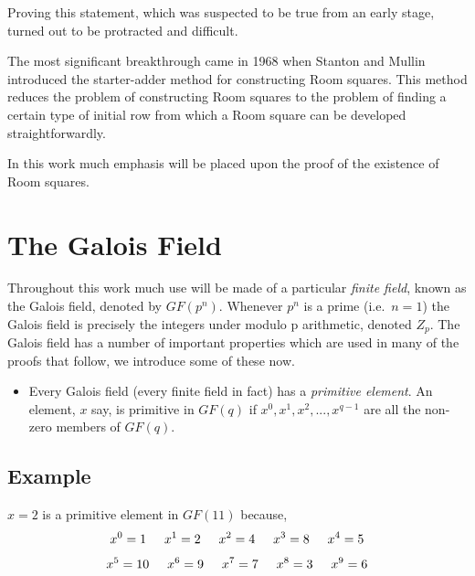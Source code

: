 \documentclass[
  11pt,
  a4paper]{book}
\providecommand{\tightlist}{%
  \setlength{\itemsep}{0pt}\setlength{\parskip}{0pt}}
\begin{document}
Proving this statement, which was suspected to be true from an early
stage, turned out to be protracted and difficult.

The most significant breakthrough came in 1968 when Stanton and Mullin
introduced the starter-adder method for constructing Room squares. This
method reduces the problem of constructing Room squares to the problem
of finding a certain type of initial row from which a Room square can be
developed straightforwardly.

In this work much emphasis will be placed upon the proof of the
existence of Room squares.

\hypertarget{the-galois-field}{%
\section{The Galois Field}\label{the-galois-field}}

Throughout this work much use will be made of a particular \emph{finite
field}, known as the Galois field, denoted by \(GF(p^n)\). Whenever \(p^n\)
is a prime (i.e.~\(n=1\)) the Galois field is precisely the integers under
modulo p arithmetic, denoted \(Z_p\). The Galois field has a number of
important properties which are used in many of the proofs that follow,
we introduce some of these now.

\begin{itemize}
\tightlist
\item
  Every Galois field (every finite field in fact) has a \emph{primitive
  element}. An element, \(x\) say, is primitive in \(GF(q)\) if
  \(x^0,x^1,x^2,...,x^{q-1}\) are all the non-zero members of \(GF(q)\).
\end{itemize}

\hypertarget{example}{%
\subsection{Example}\label{example}}

\(x=2\) is a primitive element in \(GF(11)\) because,
\[x^0 = 1 \hspace{0.5cm} x^1 = 2 \hspace{0.5cm} x^2 = 4 \hspace{0.5cm} x^3 = 8 \hspace{0.5cm} x^4 = 5\]
\[x^5 = 10 \hspace{0.5cm} x^6 = 9 \hspace{0.5cm} x^7 = 7 \hspace{0.5cm} x^8 = 3 \hspace{0.5cm} x^9 = 6\]
\end{document}
